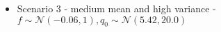 \begin{itemize}
    \item Scenario 3 - medium mean and high variance - $f \sim \mathcal{N}(-0.06, 1), q_0 \sim \mathcal{N}(5.42, 20.0)$
\end{itemize}

